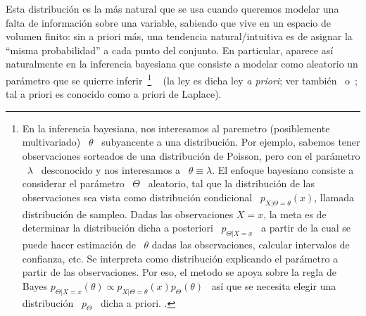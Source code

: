 \label{Sssec:MP:UniformeContinua}

Esta distribuci\'on es  la m\'as natural que se usa  cuando queremos modelar una
falta de  informaci\'on sobre una variable,  sabiendo que vive en  un espacio de
volumen  finito: sin  a  priori  m\'as, una  tendencia  natural/intuitiva es  de
asignar la  ``misma probabilidad''  a cada punto  del conjunto.   En particular,
aparece as\'i  naturalmente en  la inferencia bayesiana  que consiste  a modelar
como aleatorio un par\'ametro  que se quierre inferir~\footnote{En la inferencia
  bayesiana, nos interesamos al paremetro (posiblemente multivariado) \ $\theta$
  \ subyancente  a una distribuci\'on. Por ejemplo,  sabemos tener observaciones
  sorteados  de  una  distribuci\'on  de  Poisson, pero  con  el  par\'ametro  \
  $\lambda$ \  desconocido y  nos interesamos a  \ $\theta \equiv  \lambda$.  El
  enfoque bayesiano consiste a considerar el par\'ametro \ $\Theta$ \ aleatorio,
  tal que la  distribuci\'on de las observaciones sea  vista como distribuci\'on
  condicional \  $p_{X|\Theta = \theta}(x)$, llamada  distribuci\'on de sampleo.
  Dadas las  observaciones $X = x$,  la meta es de  determinar la distribuci\'on
  dicha a posteriori \  $p_{\Theta|X = x}$ \ a partir de  la cual se puede hacer
  estimaci\'on  de \ $\theta$  dadas las  observaciones, calcular  intervalos de
  confianza, etc. Se interpreta  como distribuci\'on explicando el par\'ametro a
  partir de  las observaciones.  Por eso, el  metodo se apoya sobre  la regla de
  Bayes $p_{\Theta|X=x}(\theta) \propto p_{X|\Theta=\theta}(x) p_\Theta(\theta)$
  \  as\'i que  se necesita  elegir una  distribuci\'on \  $p_\Theta$ \  dicha a
  priori.      \SZ{Ver     nota     de     pie     en     el     cap     2     a
    modificar}.\label{Foot:MP:BayesPrior} }
~\cite{Rob07} (la
ley  es dicha  ley  {\em a  priori};  ver tambi\'en~\cite{Bay63}  o~\cite{Lap12,
  Lap14, Lap20}; tal a priori es conocido como a priori de Laplace).

